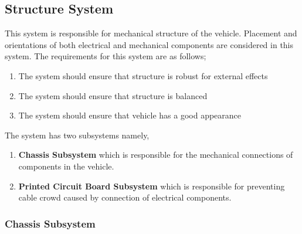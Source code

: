 \documentclass[a4paper,12pt]{article}
\begin{document}
\subsection{Structure System}

	This system is responsible for mechanical structure of the vehicle. Placement and orientations of both electrical and mechanical components are considered in this system. The requirements for this system are as follows;


	\begin{enumerate}
		\item The system should	ensure that structure is robust for external effects 
		\item The system should	ensure that structure is balanced
		\item The system should ensure that vehicle has a good appearance
	\end{enumerate}	


	The system has two subsystems namely,
	
	\begin{enumerate}
		\item \textbf{Chassis Subsystem} which is responsible for the mechanical connections of components in the vehicle.
		\item \textbf{Printed Circuit Board Subsystem} which is responsible for preventing cable crowd caused by connection of electrical components.
	\end{enumerate}


\subsubsection{Chassis Subsystem}
\end{document}
